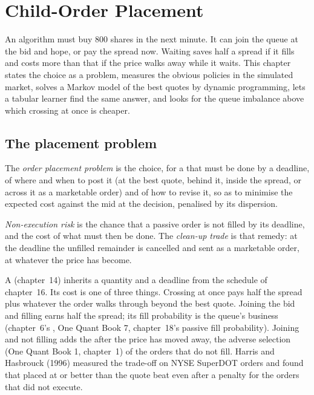 \chapter{Child-Order Placement}\label{ch:mx:child-order-placement}

An algorithm must buy 800 shares in the next minute. It can join the queue at the bid and hope, or pay the spread now. Waiting saves half a spread
if it fills and costs more than that if the price walks away while it waits. This chapter states the choice as a problem, measures the obvious
policies in the simulated market, solves a Markov model of the best quotes by dynamic programming, lets a tabular learner find the same answer, and
looks for the queue imbalance above which crossing at once is cheaper.

\section{The placement problem}

\begin{definition}\label{def:mx:child-order-placement:problem}
The \emph{order placement problem} is the choice, for a  that must be done by a deadline, of where and when
to post it (at the best quote, behind it, inside the spread, or across it as a marketable order) and of how to revise it, so as to minimise the
expected cost against the mid at the decision, penalised by its dispersion.
\end{definition}

\begin{definition}\label{def:mx:child-order-placement:risk}
\emph{Non-execution risk} is the chance that a passive order is not filled by its deadline, and the cost of what must then
be done. The \emph{clean-up trade} is that remedy: at the deadline the unfilled remainder is cancelled and sent as a marketable
order, at whatever the price has become.
\end{definition}

A  (chapter~14) inherits a quantity and a deadline from the schedule of chapter~16. Its cost is one of three things. Crossing at once pays
half the spread plus whatever the order walks through beyond the best quote. Joining the bid and filling earns half the spread; its fill probability is
the queue's business (chapter~6's , One Quant Book 7, chapter~18's passive fill probability). Joining and not filling adds the  after the price has moved away, the adverse selection (One Quant Book 1, chapter~1) of the orders that do not fill. Harris and Hasbrouck (1996)
measured the trade-off on NYSE SuperDOT orders and found that  placed at or better than the quote beat  even after a penalty
for the orders that did not execute.

